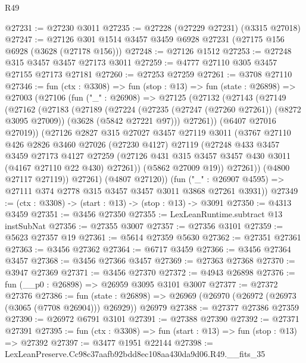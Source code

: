 \begin{lexlean}{R49}
\begin{coremodule}
@27231 := @27230 @3011
@27235 := @27228 (@27229 @27231) (@3315 @27018)
@27247 := @27126 @301 @1514 @3457 @3459 @6928 @27231 (@27175 @156 @6928 (@3628 (@27178 @156)))
@27248 := @27126 @1512
@27253 := @27248 @315 @3457 @3457 @27173 @3011
@27259 := @4777 @27110 @305 @3457 @27155 @27173 @27181
@27260 := @27253 @27259
@27261 := @3708 @27110
@27346 := fun (ctx : @3308) =>
  fun (stop : @13) =>
  fun (state : @26898) =>
  @27003
    (@27106
      (fun ("_" : @26908) =>
      @27125
        (@27132
          (@27143
            (@27149
              (@27162
                (@27183
                  (@27189
                    (@27224
                      (@27235 (@27247 (@27260 @27261)) (@8272 @3095 @27009))
                      (@3628 (@5842 @27221 @97)))
                    @27261))
                (@6407 @27016 @27019))
              (@27126
                @2827
                @315
                @27027
                @3457
                @27119
                @3011
                (@3767
                  @27110
                  @426
                  @2826
                  @3460
                  @27026
                  (@27230 @4127)
                  @27119
                  (@27248
                    @433
                    @3457
                    @3459
                    @27173
                    @4127
                    @27259
                    (@27126 @431 @315 @3457 @3457 @430 @3011 (@4167 @27110 @22 @430) @27261))
                  (@5862 @27009 @19))
                @27261))
            (@4800 @27117 @27119))
          @27261)
        (@4807 @27120))
      (fun ("_" : @26907 @4595) => @27111 @374 @2778 @315 @3457 @3457 @3011 @3868 @27261 @3931))
@27349 := (ctx : @3308) -> (start : @13) -> (stop : @13) -> @3091
@27350 := @4313 @3459
@27351 := @3456 @27350
@27355 := LexLeanRuntime.subtract @13 instSubNat
@27356 := @27355 @3007
@27357 := @27356 @3101
@27359 := @5623 @27357 @19
@27361 := @5614 @27359 @5630
@27362 := @27351 @27361
@27363 := @3456 @27362
@27364 := @6717 @3459
@27366 := @3456 @27364 @3457
@27368 := @3456 @27366 @3457
@27369 := @27363 @27368
@27370 := @3947 @27369
@27371 := @3456 @27370
@27372 := @4943 @26898
@27376 := fun (__p0 : @26898) => @26959 @3095 @3101 @3007
@27377 := @27372 @27376
@27386 := fun (state : @26898) =>
  @26969 (@26970 (@26972 (@26973 (@3065 (@7708 @26904))) @26929)) @26979
@27388 := @27377 @27386 @27359
@27390 := @26972 @6791 @3101
@27391 := @27388 @27390
@27392 := @27371 @27391
@27395 := fun (ctx : @3308) => fun (start : @13) => fun (stop : @13) => @27392
@27397 := @3477 @1951 @22144
@27398 := LexLeanPreserve.Cc98c37aafb92bdd8ec108aa430da9d06.R49.__fits_35

\end{coremodule}
\end{lexlean}
